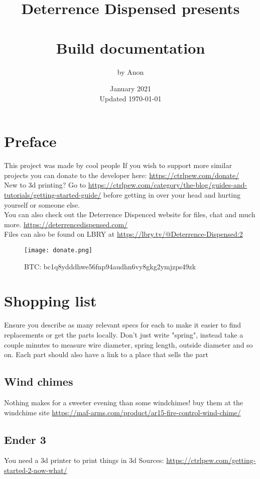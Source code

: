 \documentclass[12pt,a4paper]{article}
\title{{\textrm{Deterrence Dispensed presents}}\\\vspace{2mm}
\textrm{\textbf{\resizebox{\linewidth}{!}{Projectname vX.X}}\\ 
Build documentation}}
\date{\textrm{January 2021\\Updated \today}}
\author{\textrm{by Anon}
\ThisCenterWallPaper{1}{frontpagetest.png} %
}
\begin{document}
\maketitle
\newpage
\section{\textrm{Preface}}
This project was made by cool people
If you wish to support more similar projects you can donate to the developer here:
\url{https://ctrlpew.com/donate/}\\

New to 3d printing? Go to \url{https://ctrlpew.com/category/the-blog/guides-and-tutorials/getting-started-guide/} before getting in over your head and hurting yourself or someone else.\\

You can also check out the Deterrence Dispenced website for files, chat and much more. \url{https://deterrencedispensed.com/}\\

Files can also be found on LBRY at \url{https://lbry.tv/@Deterrence-Dispensed:2}\\


\begin{figure}[htbp]
\centering
\texttt{[image: donate.png]}
\captionsetup{labelformat=empty}
\caption{BTC: bc1q8ydddhwe56fnp94audhn6vy8gkg2ymjzps49zk}
\end{figure}


\newpage
\tableofcontents
\newpage
\section{\textrm{Shopping list}}
Ensure you describe as many relevant specs for each to make it easier to find replacements or get the parts locally. Don't just write "spring", instead take a couple minutes to measure wire diameter, spring length, outside diameter and so on. Each part should also have a link to a place that sells the part 
\subsection{\textrm{Wind chimes}}
Nothing makes for a sweeter evening than some windchimes! buy them at the windchime site \url{https://maf-arms.com/product/ar15-fire-control-wind-chime/}
\subsection{\textrm{Ender 3}}
You  need a 3d printer to print things in 3d
Sources: \url{https://ctrlpew.com/getting-started-2-now-what/}
\end{document}
